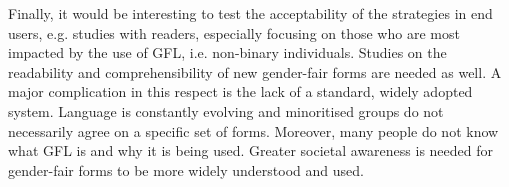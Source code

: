 Finally, it would be interesting to test the acceptability of the strategies in end users, e.g. studies with readers, especially focusing on those who are most impacted by the use of GFL, i.e. non-binary individuals. Studies on the readability and comprehensibility of new gender-fair forms are needed as well. A major complication in this respect is the lack of a standard, widely adopted system. Language is constantly evolving and minoritised groups do not necessarily agree on a specific set of forms. Moreover, many people do not know what GFL is and why it is being used. Greater societal awareness is needed for gender-fair forms to be more widely understood and used.

